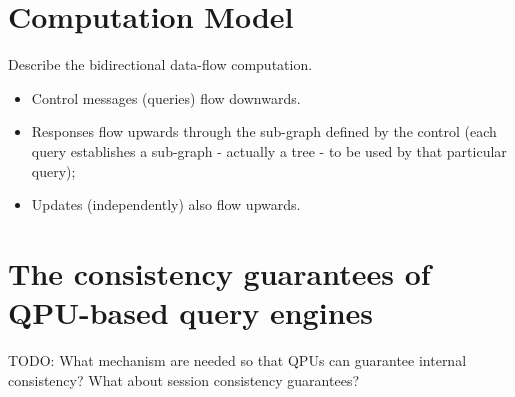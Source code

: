 \section{Computation Model}
Describe the bidirectional data-flow computation.
\begin{itemize}
  \item Control messages (queries) flow downwards.
  \item Responses flow upwards through the sub-graph defined by the control
  (each query establishes a sub-graph - actually a tree - to be used by that
  particular query);
  \item Updates (independently) also flow upwards.
\end{itemize}


\section{The consistency guarantees of QPU-based query engines}
TODO: What mechanism are needed so that QPUs can guarantee internal consistency?
What about session consistency guarantees?